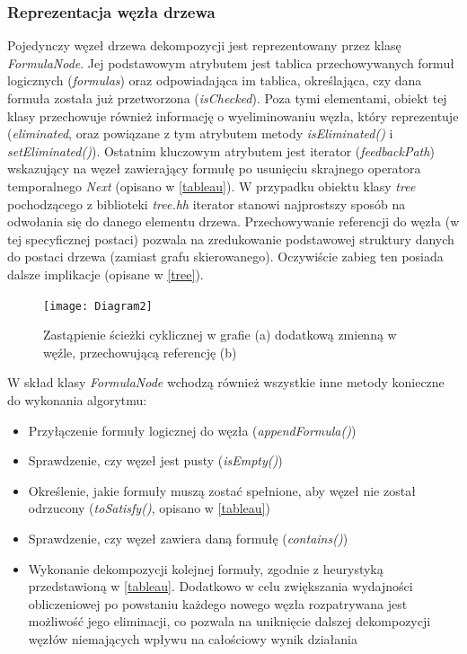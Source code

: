 \documentclass[12pt,a4paper,titlepage]{article}
\begin{document}
\subsubsection{Reprezentacja węzła drzewa}
\label{node}
Pojedynczy węzeł drzewa dekompozycji jest reprezentowany przez klasę \textit{FormulaNode}. Jej podstawowym atrybutem jest tablica przechowywanych formuł logicznych (\textit{formulas}) oraz odpowiadająca im tablica, określająca, czy dana formuła została już przetworzona (\textit{isChecked}). Poza tymi elementami, obiekt tej klasy przechowuje również informację o wyeliminowaniu węzła, który reprezentuje (\textit{eliminated}, oraz powiązane z tym atrybutem metody \textit{isEliminated()} i \textit{setEliminated()}). Ostatnim kluczowym atrybutem jest iterator (\textit{feedbackPath}) wskazujący na węzeł zawierający formułę po usunięciu skrajnego operatora temporalnego \textit{Next} (opisano w \ref{tableau}). W przypadku obiektu klasy \textit{tree} pochodzącego z biblioteki \textit{tree.hh} iterator stanowi najprostszy sposób na odwołania się do danego elementu drzewa. Przechowywanie referencji do węzła (w tej specyficznej postaci) pozwala na zredukowanie podstawowej struktury danych do postaci drzewa (zamiast grafu skierowanego). Oczywiście zabieg ten posiada dalsze implikacje (opisane w \ref{tree}).

\begin{figure}[!htb]
\centering
\texttt{[image: Diagram2]}
\caption{Zastąpienie ścieżki cyklicznej w grafie (a) dodatkową zmienną w węźle, przechowującą referencję (b)}
\end{figure}

W skład klasy \textit{FormulaNode} wchodzą również wszystkie inne metody konieczne do wykonania algorytmu:
\begin{itemize}
	\item Przyłączenie formuły logicznej do węzła (\textit{appendFormula()})
	\item Sprawdzenie, czy węzeł jest pusty (\textit{isEmpty()})
	\item Określenie, jakie formuły muszą zostać spełnione, aby węzeł nie został odrzucony (\textit{toSatisfy()}, opisano w \ref{tableau})
	\item Sprawdzenie, czy węzeł zawiera daną formułę (\textit{contains()})
	\item Wykonanie dekompozycji kolejnej formuły, zgodnie z heurystyką przedstawioną w \ref{tableau}. Dodatkowo w celu zwiększania wydajności obliczeniowej po powstaniu każdego nowego węzła rozpatrywana jest możliwość jego eliminacji, co pozwala na uniknięcie dalszej dekompozycji węzłów niemających wpływu na całościowy wynik działania
\end{itemize}
\end{document}
